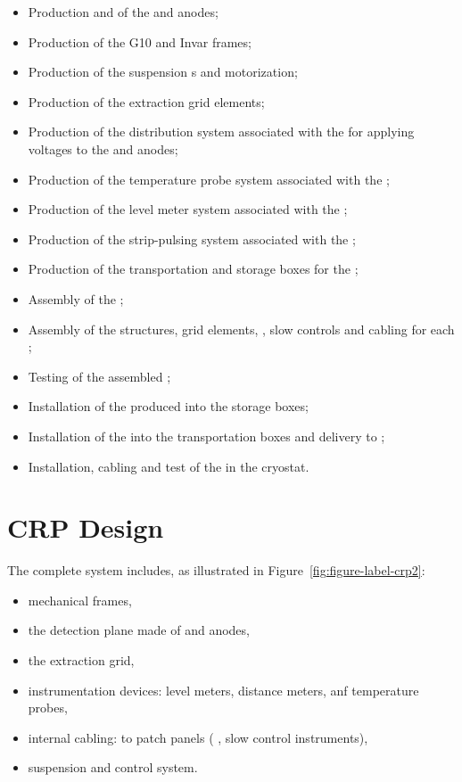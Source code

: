 \begin{itemize}
\item  Production and  of the  and anodes;
\item  Production of the G10 and Invar frames;
\item Production of the suspension \fdth{}s and motorization;
\item Production of the extraction grid elements;
\item Production of the  distribution system associated with the  for applying voltages to the  and anodes;
\item Production of the temperature probe system associated with the ;
\item Production of the level meter system associated with the ;
\item Production of the strip-pulsing system  %
associated with the ;
\item Production of the transportation and storage boxes for the ;
\item Assembly of the ;
\item Assembly of the  structures,   grid elements, , slow controls and cabling for each ;
\item Testing of the assembled ;
\item Installation of the produced  into the storage boxes;
\item Installation of the  into the transportation boxes and delivery to \surf{}; %
\item Installation, cabling and test of the  in the cryostat.
\end{itemize}


\section{CRP Design}
\label{sec:fddp-crp-design}

The complete  system includes, as illustrated in Figure~\ref{fig:figure-label-crp2}:
\begin{itemize}
\item mechanical frames,
\item the detection plane made of  and anodes,
\item the extraction grid,
\item instrumentation devices: level meters, distance meters, anf temperature probes,
\item internal cabling: to patch panels ( , slow control instruments),
\item suspension and control system.
\end{itemize}


